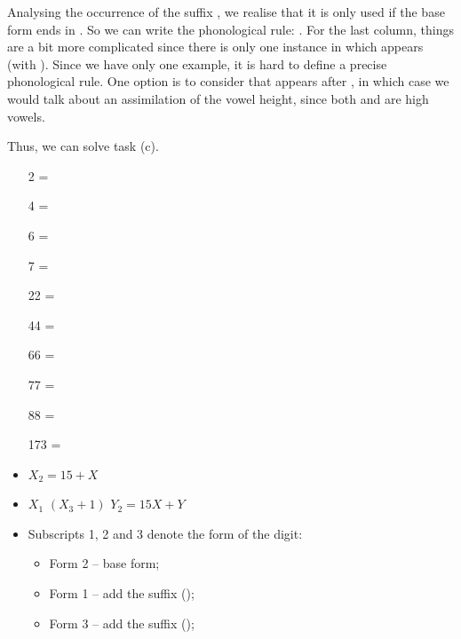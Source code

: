\begin{refsection}
\begin{mysolution}
Analysing the occurrence of the suffix , we realise that it is only used if the base form ends in . So we can write the phonological rule: \mbox{}. For the last column, things are a bit more complicated since there is only one instance in which  appears (with ). Since we have only one example, it is hard to define a precise phonological rule. One option is to consider that  appears after , in which case we would talk about an assimilation of the vowel height, since both  and  are high vowels.

Thus, we can solve task (c).

\begin{solutions}[resume]
    \item
    \begin{enumerate}
        \item[2] = 
        \item[4] = 
        \item[6] = 
        \item[7] = 
        \item[22] = 
        \item[44] = 
        \item[66] = 
        \item[77] = 
        \item[88] = 
        \item[173] = 
    \end{enumerate}
\end{solutions}

\begin{itemize}

    \item {} $X_2 = 15 + X$
    \item {} $X_1$ $(X_3 + 1)$ $Y_2 = 15X + Y$
    \item Subscripts 1, 2 and 3 denote the form of the digit:
    \begin{itemize}

        \item Form 2 -- base form;
        \item Form 1 -- add the suffix  (\mbox{});
        \item Form 3 -- add the suffix  (\mbox{});
    \end{itemize}
\end{itemize}
\end{mysolution}


\end{refsection}
